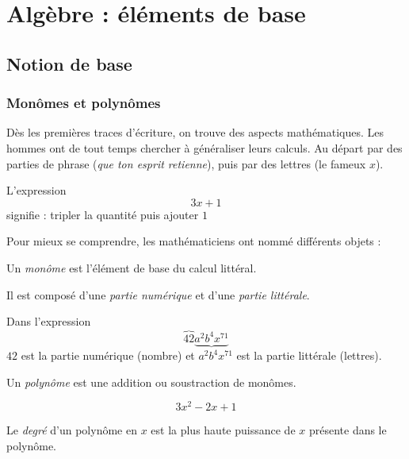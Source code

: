 \chapter{Algèbre : éléments de base}

\section{Notion de base} 
 
\subsection{Monômes et polynômes}

Dès les premières traces d'écriture, on trouve des aspects mathématiques. Les hommes ont de tout temps chercher à généraliser leurs calculs. Au départ par des parties de phrase (\textit{que ton esprit retienne}), puis par des lettres (le fameux $x$).

\begin{exemple}
L'expression
$$
3x+1
$$
signifie : tripler la quantité puis ajouter $1$
\end{exemple}

Pour mieux se comprendre, les mathématiciens ont nommé différents objets :
 
\begin{definition}[Monôme] Un \emph{monôme} est l'élément de base du calcul littéral.

Il est composé d'une \emph{partie numérique} et d'une \emph{partie littérale}.
\end{definition}
 
\begin{exemple}
Dans l'expression
$$
\overbrace{42} \underbrace{a^2 b^4 x^{71}}
$$
$42$ est la partie numérique (nombre) et $a^2 b^4 x^{71}$ est la partie littérale (lettres).
\end{exemple}

\begin{definition}[Polynôme]
Un \emph{polynôme} est une addition ou soustraction de monômes.
\end{definition}

\begin{exemple}
$$
3x^2 - 2x + 1
$$
\end{exemple}

\begin{definition}
Le \emph{degré} d'un polynôme en $x$ est la plus haute puissance de $x$ présente dans le polynôme.
\end{definition}

